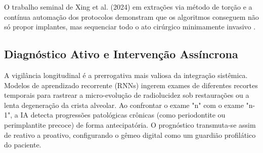 O trabalho seminal de Xing et al. (2024) em extrações via método de torção e a contínua automação dos protocolos demonstram que os algoritmos conseguem não só propor implantes, mas sequenciar todo o ato cirúrgico minimamente invasivo \cite{xing2024}.

\subsection{Diagnóstico Ativo e Intervenção Assíncrona}
\label{subsec:diagnostico}

A vigilância longitudinal é a prerrogativa mais valiosa da integração sistêmica. Modelos de aprendizado recorrente (RNNs) ingerem exames de diferentes recortes temporais para rastrear a micro-evolução de radiolucidez sob restaurações ou a lenta degeneração da crista alveolar. Ao confrontar o exame "n" com o exame "n-1", a IA detecta progressões patológicas crônicas (como periodontite ou perimplantite precoce) de forma antecipatória. O prognóstico transmuta-se assim de reativo a proativo, configurando o gêmeo digital como um guardião profilático do paciente.
